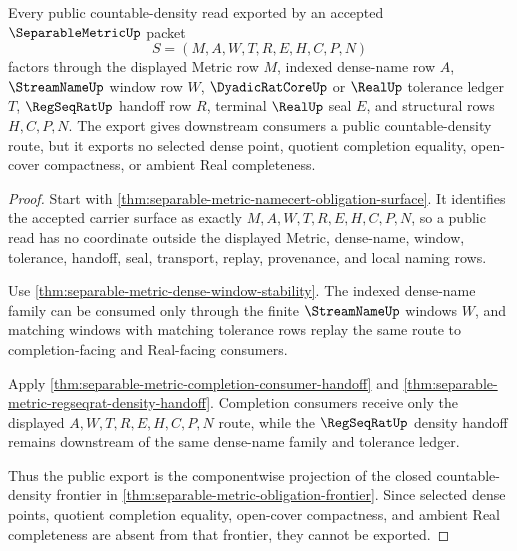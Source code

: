\begin{theorem}
\label{thm:separable-metric-public-density-export}
Every public countable-density read exported by an accepted $\SeparableMetricUp$ packet
$$
S=(M,A,W,T,R,E,H,C,P,N)
$$
factors through the displayed Metric row $M$, indexed dense-name row $A$, $\StreamNameUp$ window row $W$, $\DyadicRatCoreUp$ or $\RealUp$ tolerance ledger $T$, $\RegSeqRatUp$ handoff row $R$, terminal $\RealUp$ seal $E$, and structural rows $H,C,P,N$. The export gives downstream consumers a public countable-density route, but it exports no selected dense point, quotient completion equality, open-cover compactness, or ambient Real completeness.
\end{theorem}
\begin{proof}
Start with \autoref{thm:separable-metric-namecert-obligation-surface}. It identifies the accepted carrier surface as exactly $M,A,W,T,R,E,H,C,P,N$, so a public read has no coordinate outside the displayed Metric, dense-name, window, tolerance, handoff, seal, transport, replay, provenance, and local naming rows.

Use \autoref{thm:separable-metric-dense-window-stability}. The indexed dense-name family can be consumed only through the finite $\StreamNameUp$ windows $W$, and matching windows with matching tolerance rows replay the same route to completion-facing and Real-facing consumers.

Apply \autoref{thm:separable-metric-completion-consumer-handoff} and \autoref{thm:separable-metric-regseqrat-density-handoff}. Completion consumers receive only the displayed $A,W,T,R,E,H,C,P,N$ route, while the $\RegSeqRatUp$ density handoff remains downstream of the same dense-name family and tolerance ledger.

Thus the public export is the componentwise projection of the closed countable-density frontier in \autoref{thm:separable-metric-obligation-frontier}. Since selected dense points, quotient completion equality, open-cover compactness, and ambient Real completeness are absent from that frontier, they cannot be exported.
\end{proof}



